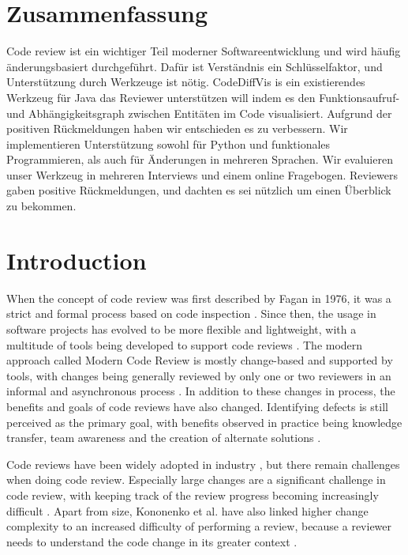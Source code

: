 \documentclass[a4paper,11pt,twoside]{article}
\theoremstyle{definition} %
\renewcommand{\cite}[1]{\citep{#1}}
\newcommand\mainmatter{%
  \cleardoublepage
  \pagenumbering{arabic}}
\begin{document}
\section*{Zusammenfassung}
Code review ist ein wichtiger Teil moderner Softwareentwicklung und wird häufig änderungsbasiert durchgeführt. Dafür ist Verständnis ein Schlüsselfaktor, und Unterstützung durch Werkzeuge ist nötig. CodeDiffVis is ein existierendes Werkzeug für Java das Reviewer unterstützen will indem es den Funktionsaufruf- und Abhängigkeitsgraph zwischen Entitäten im Code visualisiert. Aufgrund der positiven Rückmeldungen haben wir entschieden es zu verbessern. Wir implementieren Unterstützung sowohl für Python und funktionales Programmieren, als auch für Änderungen in mehreren Sprachen. Wir evaluieren unser Werkzeug in mehreren Interviews und einem online Fragebogen. Reviewers gaben positive Rückmeldungen, und dachten es sei nützlich um einen Überblick zu bekommen.
\newpage



\tableofcontents
\newpage
\listoftables
\listoffigures
\newpage 
\cleardoublepage

\mainmatter


\section{Introduction} \label{Sec:Introduction}

When the concept of code review was first described by Fagan in 1976, it was a strict and formal process based on code inspection \cite{Fagan-1976}. Since then, the usage in software projects has evolved to be more flexible and lightweight, with a multitude of tools being developed to support code reviews \cite{Rigby-2012}. The modern approach called Modern Code Review is mostly change-based and supported by tools, with changes being generally reviewed by only one or two reviewers in an informal and asynchronous process \cite{baum2016need}. In addition to these changes in process, the benefits and goals of code reviews have also changed. Identifying defects is still perceived as the primary goal, with benefits observed in practice being knowledge transfer, team awareness and the creation of alternate solutions \cite{6606617}.

Code reviews have been widely adopted in industry \citep{rigby2013convergent, baum2016need}, but there remain challenges when doing code review. Especially large changes are a significant challenge in code review, with keeping track of the review progress becoming increasingly difficult \citep{baum2016need, Baum2019}. Apart from size, Kononenko et al. have also linked higher change complexity to an increased difficulty of performing a review, because a reviewer needs to understand the code change in its greater context \cite{kononenko2016code}. 
\end{document}

